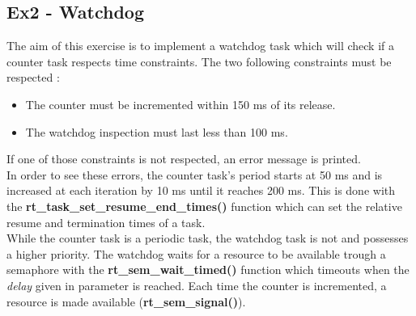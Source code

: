 \subsection{Ex2 - Watchdog}

The aim of this exercise is to implement a watchdog task which will check if a counter task respects time constraints. The two following constraints must be respected :
\begin{itemize}
    \item The counter must be incremented within 150 ms of its release.
    \item The watchdog inspection must last less than 100 ms.
\end{itemize}
If one of those constraints is not respected, an error message is printed.\\

In order to see these errors, the counter task's period starts at 50 ms and is increased at each iteration by 10 ms until it reaches 200 ms. This is done with the \textbf{rt\_task\_set\_resume\_end\_times()} function which can set the relative resume and termination times of a task.\\

While the counter task is a periodic task, the watchdog task is not and possesses a higher priority. The watchdog waits for a resource to be available trough a semaphore with the \textbf{rt\_sem\_wait\_timed()} function which timeouts when the \emph{delay} given in parameter is reached. Each time the counter is incremented, a resource is made available (\textbf{rt\_sem\_signal()}).

